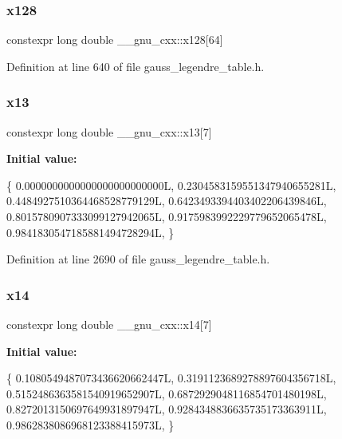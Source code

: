 \subsubsection{\texorpdfstring{x128}{x128}}
{\footnotesize\ttfamily constexpr long double \+\_\+\+\_\+gnu\+\_\+cxx\+::x128\mbox{[}64\mbox{]}}



Definition at line 640 of file gauss\+\_\+legendre\+\_\+table.\+h.

\mbox{\label{namespace____gnu__cxx_a5aacbfdf56fd00ada1423197cb01a088}} 
\subsubsection{\texorpdfstring{x13}{x13}}
{\footnotesize\ttfamily constexpr long double \+\_\+\+\_\+gnu\+\_\+cxx\+::x13\mbox{[}7\mbox{]}}

{\bfseries Initial value\+:}
\begin{DoxyCode}
\{
    0.0000000000000000000000000L,
    0.2304583159551347940655281L,
    0.4484927510364468528779129L,
    0.6423493394403402206439846L,
    0.8015780907333099127942065L,
    0.9175983992229779652065478L,
    0.9841830547185881494728294L,
  \}
\end{DoxyCode}


Definition at line 2690 of file gauss\+\_\+legendre\+\_\+table.\+h.

\mbox{\label{namespace____gnu__cxx_af287aa3b6184d67e6d7aa2273acda544}} 
\subsubsection{\texorpdfstring{x14}{x14}}
{\footnotesize\ttfamily constexpr long double \+\_\+\+\_\+gnu\+\_\+cxx\+::x14\mbox{[}7\mbox{]}}

{\bfseries Initial value\+:}
\begin{DoxyCode}
\{
    0.1080549487073436620662447L,
    0.3191123689278897604356718L,
    0.5152486363581540919652907L,
    0.6872929048116854701480198L,
    0.8272013150697649931897947L,
    0.9284348836635735173363911L,
    0.9862838086968123388415973L,
  \}
\end{DoxyCode}


